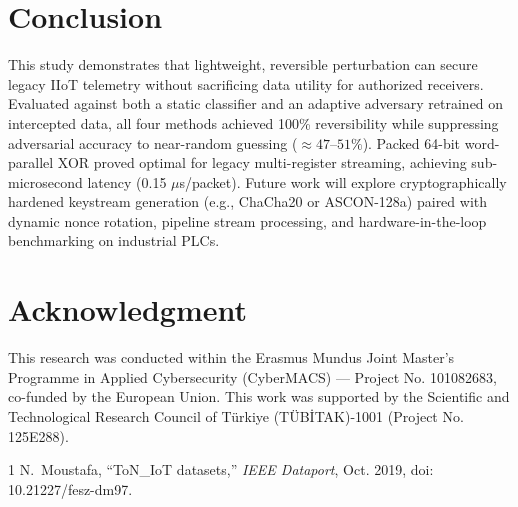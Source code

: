 \documentclass[conference]{IEEEtran}
\begin{document}
\balance

\section{Conclusion}
This study demonstrates that lightweight, reversible perturbation can secure legacy IIoT telemetry without sacrificing data utility for authorized receivers. Evaluated against both a static classifier and an adaptive adversary retrained on intercepted data, all four methods achieved 100\% reversibility while suppressing adversarial accuracy to near-random guessing ($\approx 47$--$51\%$). Packed 64-bit word-parallel XOR proved optimal for legacy multi-register streaming, achieving sub-microsecond latency (0.15 $\mu$s/packet). Future work will explore cryptographically hardened keystream generation (e.g., ChaCha20 or ASCON-128a) paired with dynamic nonce rotation, pipeline stream processing, and hardware-in-the-loop benchmarking on industrial PLCs.

\section*{Acknowledgment}
This research was conducted within the Erasmus Mundus Joint Master's Programme in Applied Cybersecurity (CyberMACS) --- Project No. 101082683, co-funded by the European Union. This work was supported by the Scientific and Technological Research Council of T\"{u}rkiye (T\"{U}B\.{I}TAK)-1001 (Project No. 125E288).

\begin{thebibliography}{1}
N.~Moustafa, ``ToN\_IoT datasets,'' \emph{IEEE Dataport}, Oct. 2019, doi: 10.21227/fesz-dm97.
\end{thebibliography}
\end{document}

